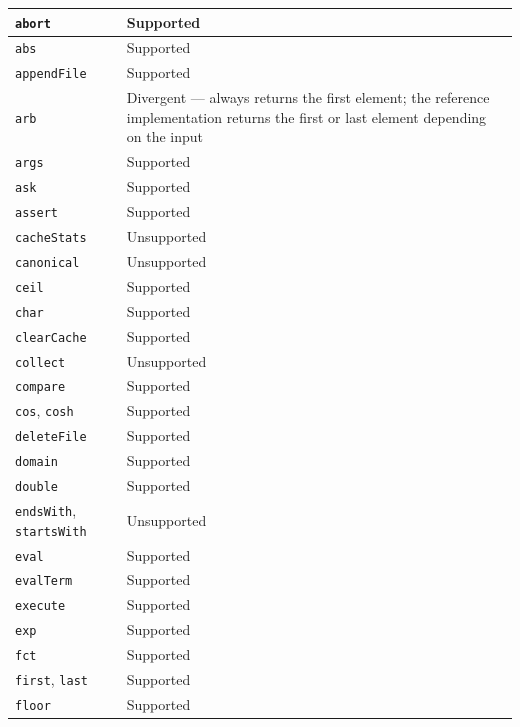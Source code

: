 \begin{longtable}{|p{4cm}|p{9cm}|}
    \hline
    \endlastfoot
        \texttt{abort} & Supported \\
        \hline
        \texttt{abs} & Supported \\
        \hline
        \texttt{appendFile} & Supported \\
        \hline
        \texttt{arb} & Divergent --- always returns the first element; the reference implementation returns the first or last element depending on the input \\
        \hline
        \texttt{args} & Supported \\
        \hline
        \texttt{ask} & Supported \\
        \hline
        \texttt{assert} & Supported \\
        \hline
        \texttt{cacheStats} & Unsupported \\
        \hline
        \texttt{canonical} & Unsupported \\
        \hline
        \texttt{ceil} & Supported \\
        \hline
        \texttt{char} & Supported \\
        \hline
        \texttt{clearCache} & Supported \\
        \hline
        \texttt{collect} & Unsupported \\
        \hline
        \texttt{compare} & Supported \\
        \hline
        \texttt{cos}, \texttt{cosh} & Supported \\
        \hline
        \texttt{deleteFile} & Supported \\
        \hline
        \texttt{domain} & Supported \\
        \hline
        \texttt{double} & Supported \\
        \hline
        \texttt{endsWith}, \texttt{startsWith} & Unsupported \\
        \hline
        \texttt{eval} & Supported \\
        \hline
        \texttt{evalTerm} & Supported \\
        \hline
        \texttt{execute} & Supported \\
        \hline
        \texttt{exp} & Supported \\
        \hline
        \texttt{fct} & Supported \\
        \hline
        \texttt{first}, \texttt{last} & Supported \\
        \hline
        \texttt{floor} & Supported \\

\end{longtable}
